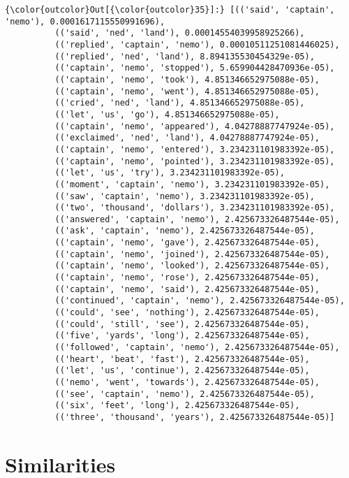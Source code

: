 \documentclass[11pt]{article}
\begin{document}
\begin{Verbatim}[commandchars=\\\{\}]
{\color{outcolor}Out[{\color{outcolor}35}]:} [(('said', 'captain', 'nemo'), 0.0001617115550991696),
          (('said', 'ned', 'land'), 0.00014554039958925266),
          (('replied', 'captain', 'nemo'), 0.00010511251081446025),
          (('replied', 'ned', 'land'), 8.894135530454329e-05),
          (('captain', 'nemo', 'stopped'), 5.659904428470936e-05),
          (('captain', 'nemo', 'took'), 4.851346652975088e-05),
          (('captain', 'nemo', 'went'), 4.851346652975088e-05),
          (('cried', 'ned', 'land'), 4.851346652975088e-05),
          (('let', 'us', 'go'), 4.851346652975088e-05),
          (('captain', 'nemo', 'appeared'), 4.04278887747924e-05),
          (('exclaimed', 'ned', 'land'), 4.04278887747924e-05),
          (('captain', 'nemo', 'entered'), 3.234231101983392e-05),
          (('captain', 'nemo', 'pointed'), 3.234231101983392e-05),
          (('let', 'us', 'try'), 3.234231101983392e-05),
          (('moment', 'captain', 'nemo'), 3.234231101983392e-05),
          (('saw', 'captain', 'nemo'), 3.234231101983392e-05),
          (('two', 'thousand', 'dollars'), 3.234231101983392e-05),
          (('answered', 'captain', 'nemo'), 2.425673326487544e-05),
          (('ask', 'captain', 'nemo'), 2.425673326487544e-05),
          (('captain', 'nemo', 'gave'), 2.425673326487544e-05),
          (('captain', 'nemo', 'joined'), 2.425673326487544e-05),
          (('captain', 'nemo', 'looked'), 2.425673326487544e-05),
          (('captain', 'nemo', 'rose'), 2.425673326487544e-05),
          (('captain', 'nemo', 'said'), 2.425673326487544e-05),
          (('continued', 'captain', 'nemo'), 2.425673326487544e-05),
          (('could', 'see', 'nothing'), 2.425673326487544e-05),
          (('could', 'still', 'see'), 2.425673326487544e-05),
          (('five', 'yards', 'long'), 2.425673326487544e-05),
          (('followed', 'captain', 'nemo'), 2.425673326487544e-05),
          (('heart', 'beat', 'fast'), 2.425673326487544e-05),
          (('let', 'us', 'continue'), 2.425673326487544e-05),
          (('nemo', 'went', 'towards'), 2.425673326487544e-05),
          (('see', 'captain', 'nemo'), 2.425673326487544e-05),
          (('six', 'feet', 'long'), 2.425673326487544e-05),
          (('three', 'thousand', 'years'), 2.425673326487544e-05)]
\end{Verbatim}
            
    \section{Similarities}\label{similarities}
\end{document}
